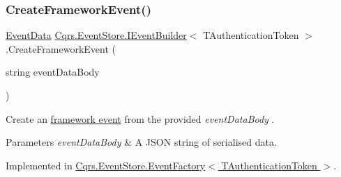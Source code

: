 \mbox{\label{interfaceCqrs_1_1EventStore_1_1IEventBuilder_a341d5c54ef8a271a8248e0a5266e6228_a341d5c54ef8a271a8248e0a5266e6228}} 
\subsubsection{\texorpdfstring{Create\+Framework\+Event()}{CreateFrameworkEvent()}\hspace{0.1cm}{\footnotesize\ttfamily [1/4]}}
{\footnotesize\ttfamily \hyperlink{classCqrs_1_1Events_1_1EventData}{Event\+Data} \hyperlink{interfaceCqrs_1_1EventStore_1_1IEventBuilder}{Cqrs.\+Event\+Store.\+I\+Event\+Builder}$<$ T\+Authentication\+Token $>$.Create\+Framework\+Event (\begin{DoxyParamCaption}\item[{string}]{event\+Data\+Body }\end{DoxyParamCaption})}



Create an \hyperlink{}{framework event} from the provided {\itshape event\+Data\+Body} . 


\begin{DoxyParams}{Parameters}
{\em event\+Data\+Body} & A J\+S\+ON string of serialised data.\\
\hline
\end{DoxyParams}


Implemented in \hyperlink{classCqrs_1_1EventStore_1_1EventFactory_adbcf9f3c67cfef3fe894e5fb53e8b800_adbcf9f3c67cfef3fe894e5fb53e8b800}{Cqrs.\+Event\+Store.\+Event\+Factory$<$ T\+Authentication\+Token $>$}.

\mbox{\label{interfaceCqrs_1_1EventStore_1_1IEventBuilder_a8ee9560f7b53c67b9946c3b0719eca96_a8ee9560f7b53c67b9946c3b0719eca96}} 
